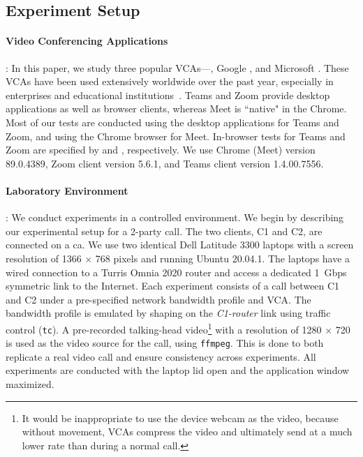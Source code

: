 \subsection{Experiment Setup} 
\label{subsec:setup}

\paragraph{Video Conferencing Applications}:
In this paper, we study three popular VCAs---\zoom, Google \meet, and Microsoft \teams.
These VCAs have been used extensively worldwide over the past year, especially
in enterprises and educational institutions~\cite{vca_share}.  Teams and Zoom
provide desktop applications as well as browser clients, whereas Meet is ``native"
in the Chrome. Most of our tests are conducted using the desktop
applications for Teams and Zoom, and using the Chrome browser for Meet.
In-browser tests for Teams and Zoom are specified by \textit{\teamsbrowser}
and \textit{\zoombrowser}, respectively. We use Chrome (Meet) version
89.0.4389, Zoom client version 5.6.1, and Teams client version 1.4.00.7556.


\paragraph{Laboratory Environment}:
We conduct experiments in a controlled environment.  We begin by describing
our experimental setup for a 2-party call.  The two clients, C1 and C2, are connected
on a ca.  We use two
identical Dell Latitude 3300 laptops with a screen resolution of 1366 $\times$
768 pixels and running Ubuntu 20.04.1. The laptops have a wired connection to
a Turris Omnia 2020 router and access a dedicated 1~Gbps symmetric link
to the Internet.  Each experiment consists of a call between C1 and C2 under a
pre-specified network bandwidth profile and VCA. The bandwidth profile is
emulated by shaping on the \textit{C1-router} link using traffic control
(\texttt{tc}). A pre-recorded talking-head video\footnote{It would be inappropriate to use the 
device webcam as the video, because without movement, VCAs compress the video
and ultimately send at a much lower rate than during a normal call.} with a
resolution of 1280 $\times$ 720 is used as the video source for the call, using \texttt{ffmpeg}.
This is done to both replicate a real video call and ensure consistency across
experiments. All experiments are conducted with the laptop lid open and the
application window maximized. 


